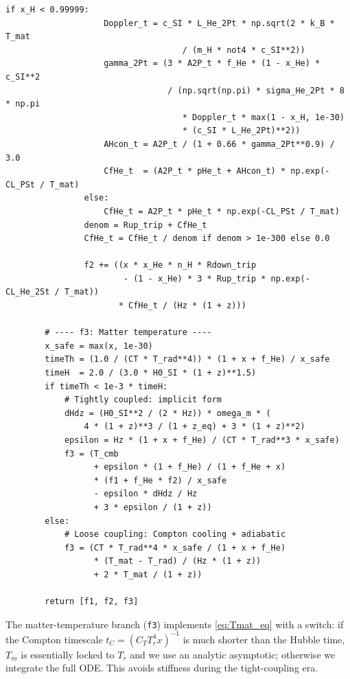 \begin{codebox}
\begin{lstlisting}[style=python]
                if x_H < 0.99999:
                    Doppler_t = c_SI * L_He_2Pt * np.sqrt(2 * k_B * T_mat
                                    / (m_H * not4 * c_SI**2))
                    gamma_2Pt = (3 * A2P_t * f_He * (1 - x_He) * c_SI**2
                                 / (np.sqrt(np.pi) * sigma_He_2Pt * 8 * np.pi
                                    * Doppler_t * max(1 - x_H, 1e-30)
                                    * (c_SI * L_He_2Pt)**2))
                    AHcon_t = A2P_t / (1 + 0.66 * gamma_2Pt**0.9) / 3.0
                    CfHe_t  = (A2P_t * pHe_t + AHcon_t) * np.exp(-CL_PSt / T_mat)
                else:
                    CfHe_t = A2P_t * pHe_t * np.exp(-CL_PSt / T_mat)
                denom = Rup_trip + CfHe_t
                CfHe_t = CfHe_t / denom if denom > 1e-300 else 0.0

                f2 += ((x * x_He * n_H * Rdown_trip
                        - (1 - x_He) * 3 * Rup_trip * np.exp(-CL_He_2St / T_mat))
                       * CfHe_t / (Hz * (1 + z)))

        # ---- f3: Matter temperature ----
        x_safe = max(x, 1e-30)
        timeTh = (1.0 / (CT * T_rad**4)) * (1 + x + f_He) / x_safe
        timeH  = 2.0 / (3.0 * H0_SI * (1 + z)**1.5)
        if timeTh < 1e-3 * timeH:
            # Tightly coupled: implicit form
            dHdz = (H0_SI**2 / (2 * Hz)) * omega_m * (
                4 * (1 + z)**3 / (1 + z_eq) + 3 * (1 + z)**2)
            epsilon = Hz * (1 + x + f_He) / (CT * T_rad**3 * x_safe)
            f3 = (T_cmb
                  + epsilon * (1 + f_He) / (1 + f_He + x)
                  * (f1 + f_He * f2) / x_safe
                  - epsilon * dHdz / Hz
                  + 3 * epsilon / (1 + z))
        else:
            # Loose coupling: Compton cooling + adiabatic
            f3 = (CT * T_rad**4 * x_safe / (1 + x + f_He)
                  * (T_mat - T_rad) / (Hz * (1 + z))
                  + 2 * T_mat / (1 + z))

        return [f1, f2, f3]
\end{lstlisting}
\end{codebox}

The matter-temperature branch (\texttt{f3}) implements \cref{eq:Tmat_eq} with a switch: if the Compton timescale $t_C = (C_T T_r^4 x)^{-1}$ is much shorter than the Hubble time, $T_m$ is essentially locked to $T_r$ and we use an analytic asymptotic; otherwise we integrate the full ODE. This avoids stiffness during the tight-coupling era.

